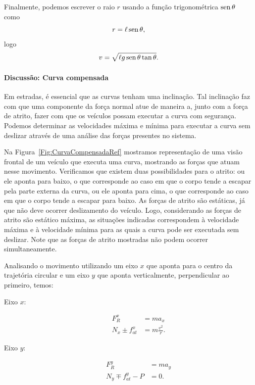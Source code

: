 Finalmente, podemos escrever o raio $r$ usando a função trigonométrica $\operatorname{sen}\theta$ como
\begin{equation}
    r = \ell \operatorname{sen}\theta,
\end{equation}
%
logo
\begin{equation}
    v = \sqrt{\ell g \operatorname{sen}\theta\tan\theta}.
\end{equation}

\paragraph{Discussão: Curva compensada}

Em estradas, é essencial que as curvas tenham uma inclinação. Tal inclinação faz com que uma componente da força normal atue de maneira a, junto com a força de atrito, fazer com que os veículos possam executar a curva com segurança. Podemos determinar as velocidades máxima e mínima para executar a curva sem deslizar através de uma análise das forças presentes no sistema.

Na Figura~\ref{Fig:CurvaCompensadaRef} mostramos representação de uma visão frontal de um veículo que executa uma curva, mostrando as forças que atuam nesse movimento. Verificamos que existem duas possibilidades para o atrito: ou ele aponta para baixo, o que corresponde ao caso em que o corpo tende a escapar pela parte externa da curva, ou ele aponta para cima, o que corresponde ao caso em que o corpo tende a escapar para baixo. As forças de atrito são estáticas, já que não deve ocorrer deslizamento do veículo. Logo, considerando as forças de atrito são estático máxima, as situações indicadas correspondem à velocidade máxima e à velocidade mínima para as quais a curva pode ser executada sem deslizar. Note que as forças de atrito mostradas não podem ocorrer simultaneamente.

Analisando o movimento utilizando um eixo $x$ que aponta para o centro da trajetória circular e um eixo $y$ que aponta verticalmente, perpendicular ao primeiro, temos:
\begin{description}
    \item[Eixo $x$:]
        \begin{align}
            F_R^x &= m a_x \\
            N_x \pm f_{at}^x &= m \frac{v^2}{r}.
        \end{align}
    \item[Eixo $y$:]
        \begin{align}
            F_R^y &= m a_y \\
            N_y \mp f_{at}^y - P &= 0.
        \end{align}
\end{description}

